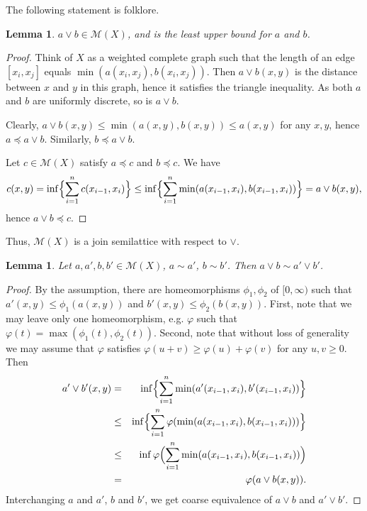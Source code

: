 \documentclass[reqno,12pt]{amsart}
\theoremstyle{plain}%
\newtheorem{lem}[thm]{Lemma}
\theoremstyle{definition}
\theoremstyle{remark}
\numberwithin{equation}{section}
\begin{document}
The following statement is folklore.

\begin{lem}
$a\lor b\in\mathcal M(X)$, and is the least upper bound for $a$ and $b$.

\end{lem}
\begin{proof}
Think of $X$ as a weighted complete graph such that the length of an edge $[x_i,x_j]$ equals $\min(a(x_i,x_j),b(x_i,x_j))$. Then $a\lor b(x,y)$ is the distance between $x$ and $y$ in this graph, hence it satisfies the triangle inequality. As both $a$ and $b$ are uniformly discrete, so is $a\lor b$.

Clearly, $a\lor b(x,y)\leq \min(a(x,y),b(x,y))\leq a(x,y)$ for any $x,y$, hence $a\preceq a\lor b$. Similarly, $b\preceq a\lor b$.

Let $c\in \mathcal M(X)$ satisfy $a\preceq c$ and $b\preceq c$. We have 
$$
c(x,y)=\inf\Bigl\{\sum_{i=1}^n c(x_{i-1},x_i)\Bigr\}\leq \inf\Bigl\{\sum_{i=1}^n\min(a(x_{i-1},x_i),b(x_{i-1},x_i))\Bigr\}=a\lor b(x,y),
$$  
hence $a\lor b\preceq c$.
\end{proof}

Thus, $\mathcal M(X)$ is a join semilattice with respect to $\lor$.

\begin{lem}
Let $a,a',b,b'\in\mathcal M(X)$, $a\sim a'$, $b\sim b'$. Then $a\lor b\sim a'\lor b'$. 

\end{lem}
\begin{proof}
By the assumption, there are homeomorphisms $\phi_1,\phi_2$ of $[0,\infty)$ such that $a'(x,y)\leq\phi_1(a(x,y))$ and $b'(x,y)\leq\phi_2(b(x,y))$. First, note that we may leave only one homeomorphism, e.g. $\varphi$ such that $\varphi(t)=\max(\phi_1(t),\phi_2(t))$. Second, note that without loss of generality we may assume that $\varphi$ satisfies $\varphi(u+v)\geq\varphi(u)+\varphi(v)$ for any $u,v\geq 0$. Then
\begin{eqnarray*}
a'\lor b'(x,y)&=&\inf\Bigl\{\sum_{i=1}^n\min(a'(x_{i-1},x_i),b'(x_{i-1},x_i))\Bigr\}\\
&\leq&
\inf\Bigl\{\sum_{i=1}^n\varphi(\min(a(x_{i-1},x_i),b(x_{i-1},x_i)))\Bigr\}\\
&\leq& 
\inf\varphi\Bigl(\sum_{i=1}^n\min(a(x_{i-1},x_i),b(x_{i-1},x_i))\Bigr)\\
&=&\varphi(a\lor b(x,y)).
\end{eqnarray*}  
Interchanging $a$ and $a'$, $b$ and $b'$, we get coarse equivalence of $a\lor b$ and $a'\lor b'$.
\end{proof}
\end{document}
